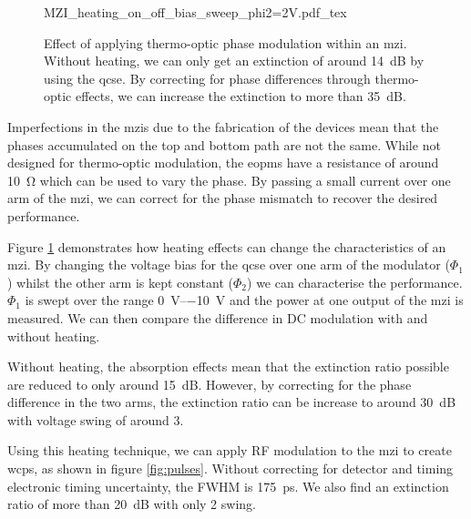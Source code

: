\begin{figure}[tp]
	\centering
	\small
	\def\svgwidth{0.8\textwidth} 
	{MZI_heating_on_off_bias_sweep_phi2=2V.pdf_tex}
	\caption[MZI optimisation through thermo-optic phase modulation]{Effect of applying thermo-optic phase modulation within an \ac{mzi}. Without heating, we can only get an extinction of around \SI{14}{dB} by using the \ac{qcse}. By correcting for phase differences through thermo-optic effects, we can increase the extinction to more than \SI{35}{dB}.} %
	\label{fig:mzi_heating}
\end{figure}

Imperfections in the \acp{mzi} due to the fabrication of the devices mean that the phases accumulated on the top and bottom path are not the same. While not designed for thermo-optic modulation, the \acp{eopm} have a resistance of around \SI{10}{\ohm} which can be used to vary the phase. By passing a small current over one arm of the \ac{mzi}, we can correct for the phase mismatch to recover the desired performance.

Figure \ref{fig:mzi_heating} demonstrates how heating effects can change the characteristics of an \ac{mzi}. By changing the voltage bias for the \ac{qcse} over one arm of the modulator ($\Phi_1$) whilst the other arm is kept constant ($\Phi_2$) we can characterise the performance. $\Phi_1$ is swept over the range \SIrange{0}{-10}{V} and the power at one output of the \ac{mzi} is measured. We can then compare the difference in DC modulation with and without heating. 

Without heating, the absorption effects mean that the extinction ratio possible are reduced to only around \SI{15}{dB}. However, by correcting for the phase difference in the two arms, the extinction ratio can be increase to around \SI{30}{dB} with voltage swing of around \SI{3}{\Vpp}. 

Using this heating technique, we can apply RF modulation to the \ac{mzi} to create \acp{wcp}, as shown in figure \ref{fig:pulses}. Without correcting for detector and timing electronic timing uncertainty, the \ac{FWHM} is \SI{175}{ps}. We also find an extinction ratio of more than \SI{20}{dB} with only \SI{2}{\Vpp} swing.

